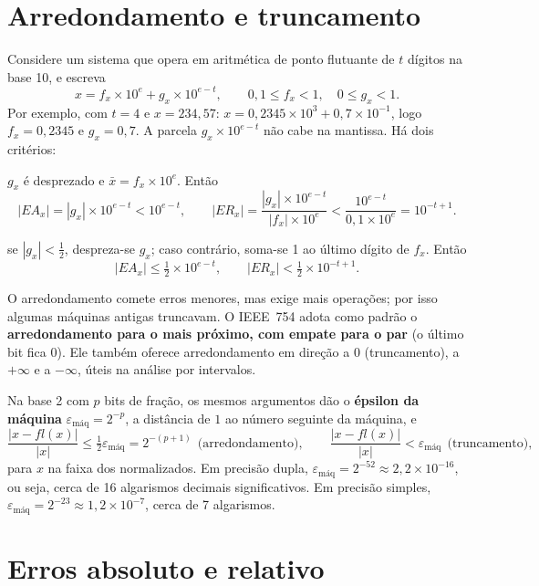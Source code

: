 \section{Arredondamento e truncamento}

Considere um sistema que opera em aritmética de ponto flutuante de $t$ dígitos na base 10, e escreva
\[
x=f_x\times10^{e}+g_x\times10^{e-t},\qquad 0{,}1\le f_x<1,\quad 0\le g_x<1 .
\]
Por exemplo, com $t=4$ e $x=234{,}57$: $x=0{,}2345\times10^{3}+0{,}7\times10^{-1}$, logo $f_x=0{,}2345$ e $g_x=0{,}7$.
A parcela $g_x\times10^{e-t}$ não cabe na mantissa. Há dois critérios:

\begin{description}[nosep]
  \item[Truncamento:] $g_x$ é desprezado e $\bar x=f_x\times10^{e}$. Então
  \[
  |EA_x|=|g_x|\times10^{e-t}<10^{e-t},\qquad
  |ER_x|=\frac{|g_x|\times10^{e-t}}{|f_x|\times10^{e}}<\frac{10^{e-t}}{0{,}1\times10^{e}}=10^{-t+1} .
  \]
  \item[Arredondamento:] se $|g_x|<\tfrac12$, despreza-se $g_x$; caso contrário, soma-se 1 ao último dígito de
  $f_x$. Então
  \[
  |EA_x|\le\tfrac12\times10^{e-t},\qquad |ER_x|<\tfrac12\times10^{-t+1} .
  \]
\end{description}

O arredondamento comete erros menores, mas exige mais operações; por isso algumas máquinas antigas
truncavam. O IEEE~754 adota como padrão o \textbf{arredondamento para o mais próximo, com empate para o
par} (o último bit fica 0). Ele também oferece arredondamento em direção a $0$ (truncamento), a $+\infty$ e a
$-\infty$, úteis na análise por intervalos.

Na base 2 com $p$ bits de fração, os mesmos argumentos dão o \textbf{épsilon da máquina}
$\varepsilon_{\text{máq}}=2^{-p}$, a distância de $1$ ao número seguinte da máquina, e
\[
\frac{|x-fl(x)|}{|x|}\le\tfrac12\varepsilon_{\text{máq}}=2^{-(p+1)}\ \ \text{(arredondamento)},
\qquad
\frac{|x-fl(x)|}{|x|}<\varepsilon_{\text{máq}}\ \ \text{(truncamento)},
\]
para $x$ na faixa dos normalizados. Em precisão dupla, $\varepsilon_{\text{máq}}=2^{-52}\approx2{,}2\times10^{-16}$,
ou seja, cerca de 16 algarismos decimais significativos. Em precisão simples,
$\varepsilon_{\text{máq}}=2^{-23}\approx1{,}2\times10^{-7}$, cerca de 7 algarismos.

\section{Erros absoluto e relativo}

